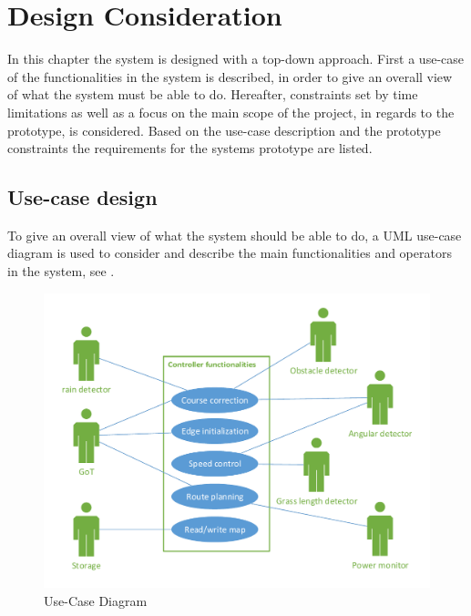 \chapter{Design Consideration}
\vspace{-5 mm}
In this chapter the system is designed with a top-down approach. First a use-case of the functionalities in the system is described, in order to give an overall view of what the system must be able to do. Hereafter, constraints set by time limitations as well as a focus on the main scope of the project, in regards to the prototype, is considered. Based on the use-case description and the prototype constraints the requirements for the systems prototype are listed.
\vspace{-4 mm}
\section{Use-case design}
To give an overall view of what the system should be able to do, a UML use-case diagram is used to consider and describe the main functionalities and operators in the system, see .
\vspace{-3 mm}
 \begin{figure}[H]
	\centering
	\includegraphics[scale=0.8]{figures/P5UseCase.pdf}
	\caption{Use-Case Diagram}
	\label{fig:usecase}
\end{figure}

